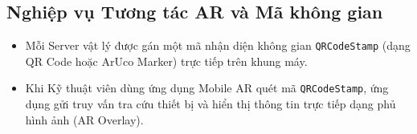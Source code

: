 \subsection{Nghiệp vụ Tương tác AR và Mã không gian}
\begin{itemize}[leftmargin=2em]
    \item Mỗi Server vật lý được gán một mã nhận diện không gian \texttt{QRCodeStamp} (dạng QR Code hoặc ArUco Marker) trực tiếp trên khung máy.
    \item Khi Kỹ thuật viên dùng ứng dụng Mobile AR quét mã \texttt{QRCodeStamp}, ứng dụng gửi truy vấn tra cứu thiết bị và hiển thị thông tin trực tiếp dạng phủ hình ảnh (AR Overlay).
\end{itemize}
